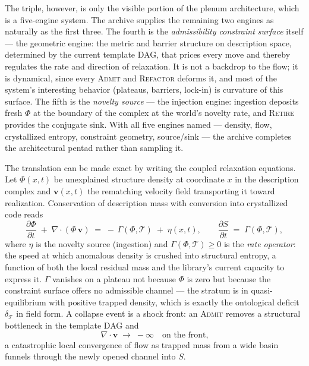 \documentclass[11pt,oneside]{book}
\theoremstyle{remark}
\newcommand{\Tem}{\mathcal{T}}
\newcommand{\Phiv}{\Phi}
\newcommand{\vv}{\mathbf{v}}
\newcommand{\Sv}{S}
\begin{document}
The triple, however, is only the visible portion of the plenum
architecture, which is a five-engine system. The archive supplies the
remaining two engines as naturally as the first three. The fourth is
the \emph{admissibility constraint surface} itself --- the geometric
engine: the metric and barrier structure on description space,
determined by the current template DAG, that prices every move and
thereby regulates the rate and direction of relaxation. It is not a
backdrop to the flow; it is dynamical, since every \textsc{Admit} and
\textsc{Refactor} deforms it, and most of the system's interesting
behavior (plateaus, barriers, lock-in) is curvature of this surface.
The fifth is the \emph{novelty source} --- the injection engine:
ingestion deposits fresh $\Phiv$ at the boundary of the complex at the
world's novelty rate, and \textsc{Retire} provides the conjugate sink.
With all five engines named --- density, flow, crystallized entropy,
constraint geometry, source/sink --- the archive completes the
architectural pentad rather than sampling it.

The translation can be made exact by writing the coupled relaxation
equations. Let $\Phiv(x,t)$ be unexplained structure density at
coordinate $x$ in the description complex and $\vv(x,t)$ the rematching
velocity field transporting it toward realization. Conservation of
description mass with conversion into crystallized code reads
\[
\frac{\partial \Phiv}{\partial t}
\;+\; \nabla \!\cdot\! (\Phiv\, \vv)
\;=\; -\,\Gamma(\Phiv, \Tem)\;+\;\eta(x,t),
\qquad
\frac{\partial \Sv}{\partial t} \;=\; \Gamma(\Phiv, \Tem),
\]
where $\eta$ is the novelty source (ingestion) and
$\Gamma(\Phiv, \Tem) \ge 0$ is the \emph{rate operator}: the speed at
which anomalous density is crushed into structural entropy, a function
of both the local residual mass and the library's current capacity to
express it. $\Gamma$ vanishes on a plateau not because $\Phiv$ is zero
but because the constraint surface offers no admissible channel ---
the stratum is in quasi-equilibrium with positive trapped density,
which is exactly the ontological deficit $\delta_{\Tem}$ in field
form. A collapse event is a shock front: an \textsc{Admit} removes a
structural bottleneck in the template DAG and
\[
\nabla \!\cdot\! \vv \;\longrightarrow\; -\infty
\quad \text{on the front,}
\]
a catastrophic local convergence of flow as trapped mass from a wide
basin funnels through the newly opened channel into $\Sv$.
\end{document}

